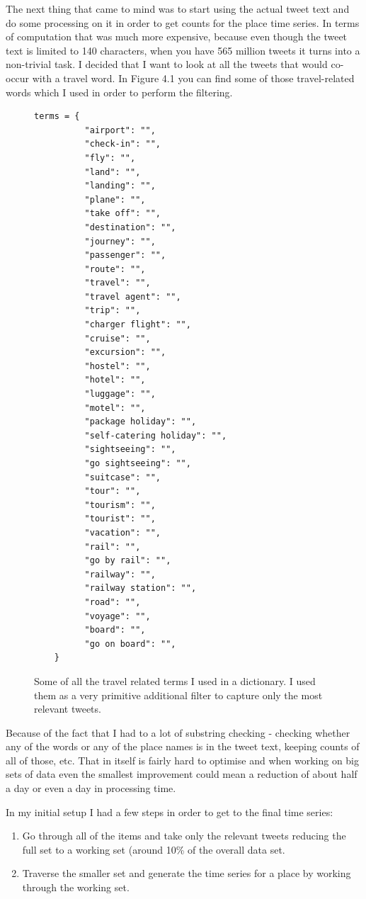 \documentclass[minf,frontabs,twoside,singlespacing,parskip]{infthesis}
\begin{document}
The next thing that came to mind was to start using the actual tweet text and do some processing on it in order to get counts for the place time series. In terms of computation that was much more expensive, because even though the tweet text is limited to 140 characters, when you have 565 million tweets it turns into a non-trivial task. I decided that I want to look at all the tweets that would co-occur with a travel word. In Figure 4.1 you can find some of those travel-related words which I used in order to perform the filtering. 


\begin{figure}[p!]
\begin{center}
\begin{lstlisting}
terms = {
          "airport": "",
          "check-in": "",
          "fly": "",
          "land": "",
          "landing": "",
          "plane": "",
          "take off": "",
          "destination": "",
          "journey": "",
          "passenger": "",
          "route": "",
          "travel": "",
          "travel agent": "",
          "trip": "",
          "charger flight": "",
          "cruise": "",
          "excursion": "",
          "hostel": "",
          "hotel": "",
          "luggage": "",
          "motel": "",
          "package holiday": "",
          "self-catering holiday": "",
          "sightseeing": "",
          "go sightseeing": "",
          "suitcase": "",
          "tour": "",
          "tourism": "",
          "tourist": "",
          "vacation": "",
          "rail": "",
          "go by rail": "",
          "railway": "",
          "railway station": "",
          "road": "",
          "voyage": "",
          "board": "",
          "go on board": "",
	}
\end{lstlisting}
\end{center}
\caption{Some of all the travel related terms I used in a dictionary. I used them as a very primitive additional filter to capture only the most relevant tweets. }
\end{figure}


Because of the fact that I had to a lot of substring checking - checking whether any of the words or any of the place names is in the tweet text, keeping counts of all of those, etc. That in itself is fairly hard to optimise and when working on big sets of data even the smallest improvement could mean a reduction of about half a day or even a day in processing time. 


In my initial setup I had a few steps in order to get to the final time series:
\begin{enumerate}
\item Go through all of the items and take only the relevant tweets reducing the full set to a working set (around 10\% of the overall data set.
\item Traverse the smaller set and generate the time series for a place by working through the working set. 
\end{enumerate}
\end{document}

